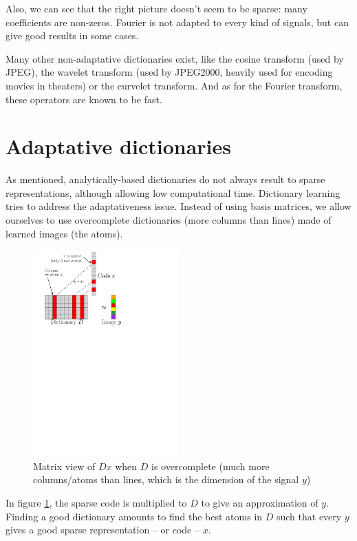 Also, we can see that the right picture doesn't seem to be sparse: many coefficients are non-zeros. Fourier is not adapted to every kind of signals, but can give good results in some cases.

Many other non-adaptative dictionaries exist, like the cosine transform (used by JPEG), the wavelet transform (used by JPEG2000, heavily used for encoding movies in theaters) or the curvelet transform. And as for the Fourier transform, these operators are known to be fast.

\section{Adaptative dictionaries}
As mentioned, analytically-based dictionaries do not always result to sparse representations, although allowing low computational time. Dictionary learning tries to address the adaptativeness issue. Instead of using basis matrices, we allow ourselves to use overcomplete dictionaries (more columns than lines) made of learned images (the atoms).
\begin{figure}[!h] \centering
\includegraphics[width=0.5\textwidth]{figures/sparsity-matrix.pdf}
\caption{Matrix view of $Dx$ when $D$ is overcomplete (much more columns/atoms than lines, which is the dimension of the signal $y$) \label{fig_overcomplete_matrix}}
\end{figure}
In figure \ref{fig_overcomplete_matrix}, the sparse code is multiplied to $D$ to give an approximation of $y$. Finding a good dictionary amounts to find the best atoms in $D$ such that every $y$ gives a good sparse representation – or code – $x$.

